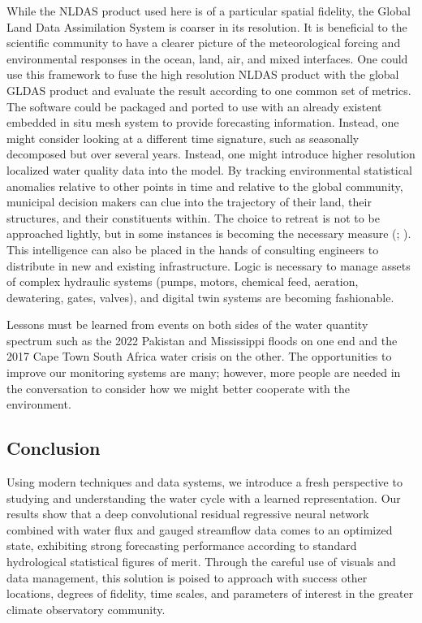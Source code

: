 \begin{refsection}
While the NLDAS product used here is of a particular spatial fidelity, the Global Land Data Assimilation System is coarser in its resolution. It is beneficial to the scientific community to have a clearer picture of the meteorological forcing and environmental responses in the ocean, land, air, and mixed interfaces. One could use this framework to fuse the high resolution NLDAS product with the global GLDAS product and evaluate the result according to one common set of metrics. The software could be packaged and ported to use with an already existent embedded in situ mesh system to provide forecasting information. Instead, one might consider looking at a different time signature, such as seasonally decomposed but over several years. Instead, one might introduce higher resolution localized water quality data into the model. By tracking environmental statistical anomalies relative to other points in time and relative to the global community, municipal decision makers can clue into the trajectory of their land, their structures, and their constituents within. The choice to retreat is not to be approached lightly, but in some instances is becoming the necessary measure (\cite{siders2019social}; \cite{hino2017managed}). This intelligence can also be placed in the hands of consulting engineers to distribute in new and existing infrastructure. Logic is necessary to manage assets of complex hydraulic systems (pumps, motors, chemical feed, aeration, dewatering, gates, valves), and digital twin systems are becoming fashionable.

Lessons must be learned from events on both sides of the water quantity spectrum such as the 2022 Pakistan and Mississippi floods on one end and the 2017 Cape Town South Africa water crisis on the other. The opportunities to improve our monitoring systems are many; however, more people are needed in the conversation to consider how we might better cooperate with the environment.

\subsection{Conclusion}
Using modern techniques and data systems, we introduce a fresh perspective to studying and understanding the water cycle with a learned representation. Our results show that a deep convolutional residual regressive neural network combined with water flux and gauged streamflow data comes to an optimized state, exhibiting strong forecasting performance according to standard hydrological statistical figures of merit. Through the careful use of visuals and data management, this solution is poised to approach with success other locations, degrees of fidelity, time scales, and parameters of interest in the greater climate observatory community.


\end{refsection}
